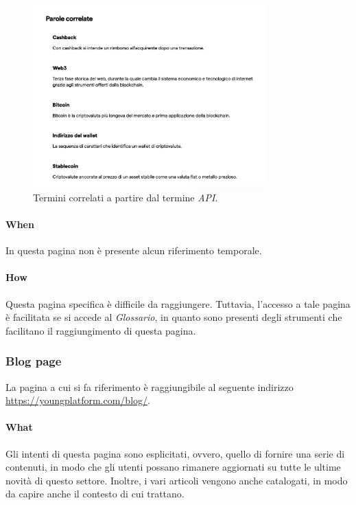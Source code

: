 \begin{figure}[H]
  \centering
  \includegraphics[width=0.80\textwidth]{res/images/internal-pages/glossary/glossary-5.png}
  \caption{Termini correlati a partire dal termine \textit{API}.}
  \label{fig:glossary-5}
\end{figure}

\paragraph{When}

In questa pagina non è presente alcun riferimento temporale.

\paragraph{How}

Questa pagina specifica è difficile da raggiungere. Tuttavia, l'accesso 
a tale pagina è facilitata se si accede al \textit{Glossario}, in quanto 
sono presenti degli strumenti che facilitano il raggiungimento di questa 
pagina.

\subsubsection{Blog page}

La pagina a cui si fa riferimento è raggiungibile al seguente indirizzo 
\href{https://youngplatform.com/blog/}{https://youngplatform.com/blog/}.

\paragraph{What}

Gli intenti di questa pagina sono esplicitati, ovvero, quello di fornire 
una serie di contenuti, in modo che gli utenti possano rimanere aggiornati 
su tutte le ultime novità di questo settore. Inoltre, i vari articoli 
vengono anche catalogati, in modo da capire anche il contesto di cui 
trattano.

